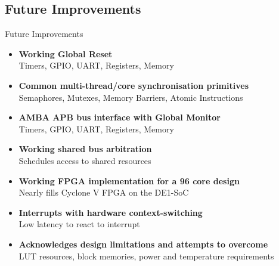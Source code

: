 \documentclass[aspectratio=169]{beamer}
\begin{document}
\subsection{Future Improvements}
\begin{frame}{Future Improvements}

\begin{itemize}
    \item \textbf{Working Global Reset}\\
    Timers, GPIO, UART, Registers, Memory
    
    \item \textbf{Common multi-thread/core synchronisation primitives}\\
    Semaphores, Mutexes, Memory Barriers, Atomic Instructions
    
    \item \textbf{AMBA APB bus interface with Global Monitor}\\
    Timers, GPIO, UART, Registers, Memory
    
    \item \textbf{Working shared bus arbitration}\\
    Schedules access to shared resources
    
    \item \textbf{Working FPGA implementation for a 96 core design}\\
    Nearly fills Cyclone V FPGA on the DE1-SoC
    
    \item \textbf{Interrupts with hardware context-switching}\\
    Low latency to react to interrupt
    
    \item \textbf{Acknowledges design limitations and attempts to overcome}\\
    LUT resources, block memories, power and temperature requirements
\end{itemize}
\end{frame}
\end{document}

